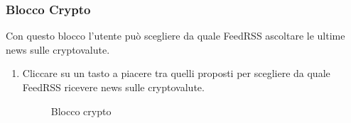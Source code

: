 \subsubsection{Blocco Crypto}
Con questo blocco l'utente può scegliere da quale FeedRSS ascoltare le ultime news sulle cryptovalute.
\begin{enumerate}
	\item Cliccare su un tasto a piacere tra quelli proposti per scegliere da quale FeedRSS ricevere news sulle cryptovalute.
\begin{figure}[!ht]
	\centering
	\caption{Blocco crypto}
\end{figure}
\end{enumerate}
\newpage
